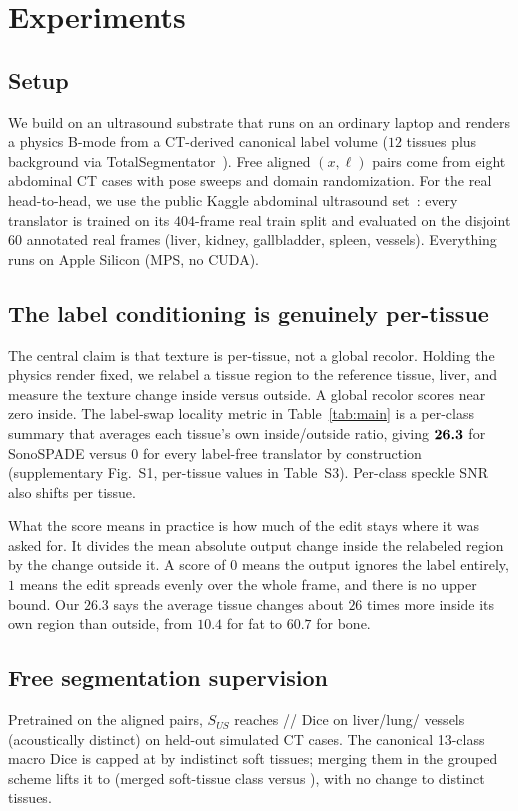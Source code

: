 \documentclass[runningheads]{llncs}
\begin{document}
\section{Experiments}
\subsection{Setup}
We build on an ultrasound substrate that runs on an ordinary laptop and renders a physics B-mode from a CT-derived canonical label volume ($12$ tissues plus background via TotalSegmentator~\cite{wasserthal2023totalseg}). Free aligned $(x,\ell)$ pairs come from eight abdominal CT cases with pose sweeps and domain randomization. 
For the real head-to-head, we use the public Kaggle abdominal ultrasound set~\cite{vitale2020realism}: every translator is trained on its $404$-frame real train split and evaluated on the disjoint $60$ annotated real frames (liver, kidney, gallbladder, spleen, vessels). 
Everything runs on Apple Silicon (MPS, no
CUDA).

\subsection{The label conditioning is genuinely per-tissue}
\label{sec:pertissue}
The central claim is that texture is per-tissue, not a global recolor. Holding the physics render fixed,
we relabel a tissue region to the reference tissue, liver, and measure the texture change inside versus outside. A global recolor scores
near zero inside. The label-swap locality metric in
Table~\ref{tab:main} is a per-class summary that averages each tissue's own inside/outside ratio,
giving $\textbf{26.3}$ for SonoSPADE versus $0$ for every label-free translator by construction (supplementary
Fig.~S1, per-tissue values in Table~S3). Per-class speckle SNR also shifts per tissue.

What the score means in practice is how much of the edit stays where it was asked for. It divides the
mean absolute output change inside the relabeled region by the change outside it. A score of $0$ means
the output ignores the label entirely, $1$ means the edit spreads evenly over the whole frame, and there
is no upper bound. Our $26.3$ says the average tissue changes about $26$ times more inside its own region
than outside, from $10.4$ for fat to $60.7$ for bone.

\subsection{Free segmentation supervision}
Pretrained on the aligned pairs, $S_{US}$ reaches \liverDice{}/\lungDice{}/\vesselDice{} Dice on
liver/lung/ vessels (acoustically distinct) on held-out simulated CT cases. The canonical 13-class macro Dice is
capped at \diceCanon{} by indistinct soft tissues; merging them in the grouped scheme lifts it to
\diceGroup{} (merged soft-tissue class \softGroup{} versus \softCanon{}), with no change to distinct
tissues.
\end{document}
